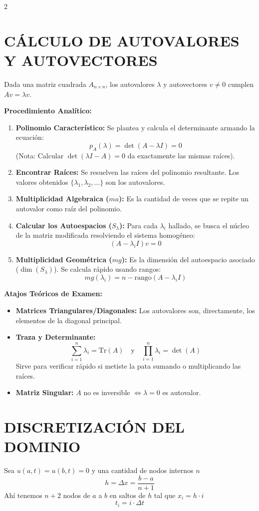 \documentclass[10pt]{extarticle}
\newenvironment{term}
  {\begin{minipage}{\linewidth}}
  {\end{minipage}\par}
\begin{document}
\begin{multicols}{2}
\begin{term}
\section*{CÁLCULO DE AUTOVALORES Y AUTOVECTORES}
Dada una matriz cuadrada $A_{n\times n}$, los autovalores $\lambda$ y autovectores $v \neq 0$ cumplen $Av = \lambda v$.

\textbf{Procedimiento Analítico:}
\begin{enumerate}
\item \textbf{Polinomio Característico:} Se plantea y calcula el determinante armando la ecuación:
$$p_A(\lambda) = \det(A - \lambda I) = 0$$
(Nota: Calcular $\det(\lambda I - A) = 0$ da exactamente las mismas raíces).
\item \textbf{Encontrar Raíces:} Se resuelven las raíces del polinomio resultante. Los valores obtenidos $\{\lambda_1, \lambda_2, \ldots\}$ son los autovalores.
\item \textbf{Multiplicidad Algebraica ($ma$):} Es la cantidad de veces que se repite un autovalor como raíz del polinomio.
\item \textbf{Calcular los Autoespacios ($S_{\lambda}$):} Para cada $\lambda_i$ hallado, se busca el núcleo de la matriz modificada resolviendo el sistema homogéneo:
$$(A - \lambda_i I)v = 0$$
\item \textbf{Multiplicidad Geométrica ($mg$):} Es la dimensión del autoespacio asociado ($\dim(S_{\lambda})$). Se calcula rápido usando rangos:
$$mg(\lambda_i) = n - \mathrm{rango}(A - \lambda_i I)$$
\end{enumerate}

\textbf{Atajos Teóricos de Examen:}
\begin{itemize}[leftmargin=1.2em]
\item \textbf{Matrices Triangulares/Diagonales:} Los autovalores son, directamente, los elementos de la diagonal principal.
\item \textbf{Traza y Determinante:} 
$$\sum_{i=1}^n \lambda_i = \mathrm{Tr}(A) \quad \text{y} \quad \prod_{i=1}^n \lambda_i = \det(A)$$
Sirve para verificar rápido si metiste la pata sumando o multiplicando las raíces.
\item \textbf{Matriz Singular:} $A$ no es inversible $\iff \lambda = 0$ es autovalor.
\end{itemize}
\end{term}

\begin{term}
    \section*{DISCRETIZACIÓN DEL DOMINIO}
    Sea $u(a,t)=u(b,t)=0$ y una cantidad de nodos internos $n$
    $$h=\Delta x=\frac{b-a}{n+1}$$
    Ahí tenemos $n+2$ nodos de $a$ a $b$ en saltos de $h$ tal que $x_i=h\cdot i$
    $$t_i=i\cdot\Delta t$$
\end{term}


\end{multicols}
\end{document}
